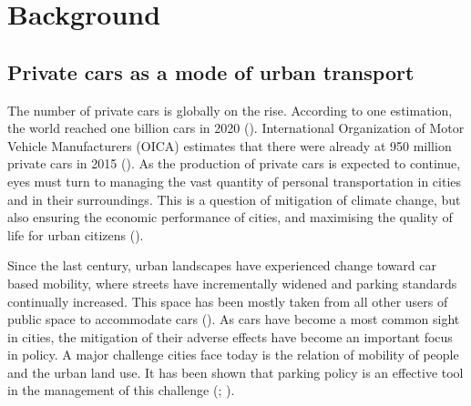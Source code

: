 \section{Background}
\label{sec:c2-background} %
\subsection{Private cars as a mode of urban transport}
\justify


The number of private cars is globally on the rise. According to one estimation, the world reached one billion cars in 2020 (\cite{Sperling2009}). International Organization of Motor Vehicle Manufacturers (OICA) estimates that there were already at 950 million private cars in 2015 (\cite{OICA2020}). As the production of private cars is expected to continue, eyes must turn to managing the vast quantity of personal transportation in cities and in their surroundings. This is a question of mitigation of climate change, but also ensuring the economic performance of cities, and maximising the quality of life for urban citizens (\cite{Bertolini2003}).

Since the last century, urban landscapes have experienced change toward car based mobility, where streets have incrementally widened and parking standards continually increased. This space has been mostly taken from all other users of public space to accommodate cars (\cite{Cervero2017}). As cars have become a most common sight in cities, the mitigation of their adverse effects have become an important focus in policy. A major challenge cities face today is the relation of mobility of people and the urban land use. It has been shown that parking policy is an effective tool in the management of this challenge (\cite{Diallo2015}; \cite{Marsden2006}).

